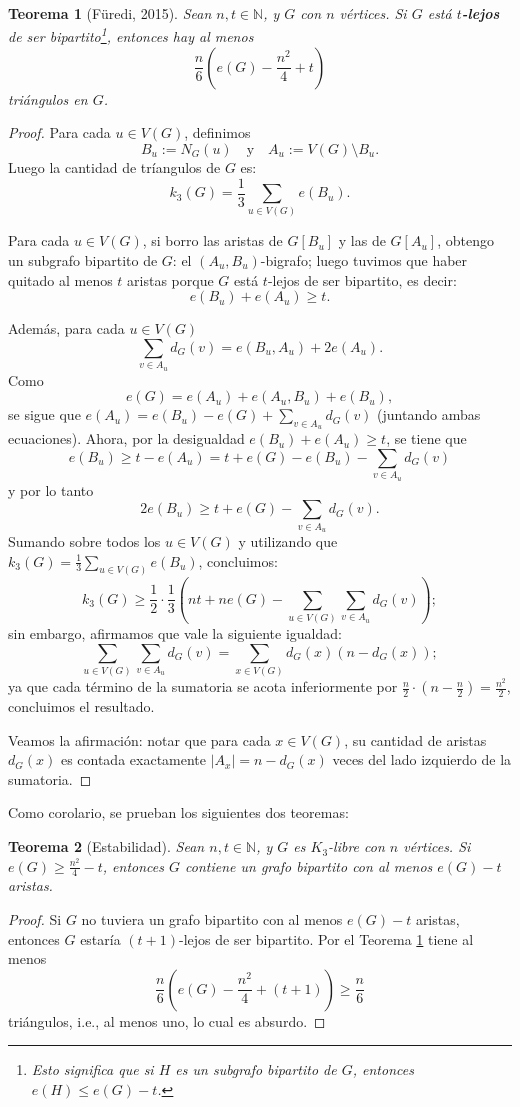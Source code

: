 \documentclass[12pt]{report}
\theoremstyle{plain}
\newtheorem{theorem}{Teorema}[section]
\theoremstyle{definition}
\newcommand{\naturals}{\mathbb{N}}
\newcommand{\abs}[1]{\left \vert #1 \right \vert}
\begin{document}
\begin{theorem}[Füredi, 2015]\label{th:teorema de furedi si G esta t lejos de ser bipartito entonces tiene triangulos}
Sean $n,t \in \naturals$, y $G$ con $n$ vértices. Si $G$ está \textbf{$t$-lejos} de ser bipartito\footnote{Esto significa que si $H$ es un subgrafo bipartito de $G$, entonces $e(H) \leq e(G)-t$.}, entonces hay al menos
\[
    \frac{n}{6} \left(e(G)-\frac{n^2}{4}+t\right)
\]
triángulos en $G$.
\end{theorem}
\begin{proof}
Para cada $u \in V(G)$, definimos
\[
    B_u := N_G (u) \quad \text{y} \quad A_u := V(G) \setminus B_u.
\]
Luego la cantidad de tríangulos de $G$ es:
\[
    k_3 (G) = \frac 1 3 \sum_{u \in V(G)} e(B_u).
\]

Para cada $u \in V(G)$, si borro las aristas de $G[B_u]$ y las de $G[A_u]$, obtengo un subgrafo bipartito de $G$: el $(A_u,B_u)$-bigrafo; luego tuvimos que haber quitado al menos $t$ aristas porque $G$ está $t$-lejos de ser bipartito, es decir:
\[
    e(B_u) + e(A_u) \geq t.
\]

Además, para cada $u \in V(G)$
\[
    \sum_{v \in A_u} d_G (v) = e(B_u, A_u) + 2e (A_u).
\]
Como
\[
    e(G) = e(A_u) + e(A_u, B_u) + e(B_u),
\]
se sigue que $e (A_u) = e(B_u) - e(G) + \sum_{v \in A_u} d_G (v)$ (juntando ambas ecuaciones). Ahora, por la desigualdad $e(B_u) + e (A_u)\geq t$, se tiene que
\[
    e(B_u) \geq t - e(A_u) = t +e(G) - e(B_u) - \sum_{v \in A_u} d_G (v)
\]
y por lo tanto
\[
    2 e(B_u) \geq t + e(G) - \sum_{v \in A_u} d_G (v).
\]
Sumando sobre todos los $u \in V(G)$ y utilizando que $k_3 (G) = \frac 1 3 \sum_{u \in V(G)} e (B_u)$, concluimos:
\[
    k_3 (G) \geq \frac 1 2 \cdot \frac 1 3 (n t + n e(G) - \sum_{u \in V(G) } \sum_{v \in A_u} d_G (v));
\]
sin embargo, afirmamos que vale la siguiente igualdad:
\[
    \sum_{u \in V(G)} \sum_{v \in A_u} d_G (v) = \sum_{x \in V(G)} d_G (x) ( n - d_G (x));
\]
ya que cada término de la sumatoria se acota inferiormente por $\frac n 2  \cdot (n - \frac n 2) = \frac{n^2}{2}$, concluimos el resultado.

Veamos la afirmación: notar que para cada $x \in V(G)$, su cantidad de aristas $d_G (x)$ es contada exactamente $\abs {A_x} = n - d_G (x)$ veces del lado izquierdo de la sumatoria.
\end{proof}

Como corolario, se prueban los siguientes dos teoremas:
\begin{theorem}[Estabilidad]
Sean $n,t \in \naturals$, y $G$ es $K_3$-libre con $n$ vértices. Si $e(G) \geq \frac{n^2}{4}- t$, entonces $G$ contiene un grafo bipartito con al menos $e(G)-t$ aristas.
\end{theorem}
\begin{proof}
Si $G$ no tuviera un grafo bipartito con al menos $e(G) - t$ aristas, entonces $G$ estaría $(t+1)$-lejos de ser bipartito. Por el Teorema \ref{th:teorema de furedi si G esta t lejos de ser bipartito entonces tiene triangulos} tiene al menos
\[
    \frac{n}{6} \left ( e(G) - \frac{n^2}{4} + (t + 1) \right ) \geq \frac n 6
\]
triángulos, i.e., al menos uno, lo cual es absurdo.
\end{proof}
\end{document}
